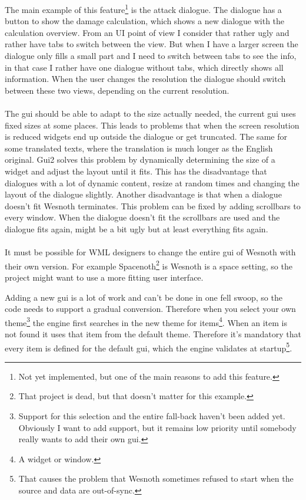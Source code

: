 \documentclass[a4paper,notitlepage]{report}
\begin{document}
The main example of this feature\footnote{Not yet implemented, but one of the
main reasons to add this feature.} is the attack dialogue. The dialogue has a
button to show the damage calculation, which shows a new dialogue with the
calculation overview. From an UI point of view I consider that rather ugly and
rather have tabs to switch between the view. But when I have a larger screen the
dialogue only fills a small part and I need to switch between tabs to see the
info, in that case I rather have one dialogue without tabs, which directly shows
all information. When the user changes the resolution the dialogue should switch
between these two views, depending on the current resolution.

\paragraph{}

The gui should be able to adapt to the size actually needed, the current gui
uses fixed sizes at some places. This leads to problems that when the screen
resolution is reduced widgets end up outside the dialogue or get truncated. The
same for some translated texts, where the translation is much longer as the
English original. Gui2 solves this problem by dynamically determining the size
of a widget and adjust the layout until it fits. This has the disadvantage that
dialogues with a lot of dynamic content, resize at random times and changing the
layout of the dialogue slightly. Another disadvantage is that when a dialogue
doesn't fit Wesnoth terminates. This problem can be fixed by adding scrollbars
to every window. When the dialogue doesn't fit the scrollbars are used and the
dialogue fits again, might be a bit ugly but at least everything fits again.

\paragraph{}

It must be possible for WML designers to change the entire gui of Wesnoth with
their own version. For example Spacenoth\footnote{That project is dead, but
that doesn't matter for this example.} is Wesnoth is a space setting, so the
project might want to use a more fitting user interface.

Adding a new gui is a lot of work and can't be done in one fell swoop, so the
code needs to support a gradual conversion. Therefore when you select your own
theme\footnote{Support for this selection and the entire fall-back haven't been
added yet. Obviously I want to add support, but it remains low priority until
somebody really wants to add their own gui.} the engine first searches in the
new theme for items\footnote{A widget or window.}. When an item is not found it
uses that item from the default theme. Therefore it's mandatory that every item
is defined for the default gui, which the engine validates at
startup\footnote{That causes the problem that Wesnoth sometimes refused to start
when the source and data are out-of-sync.}.
\end{document}
